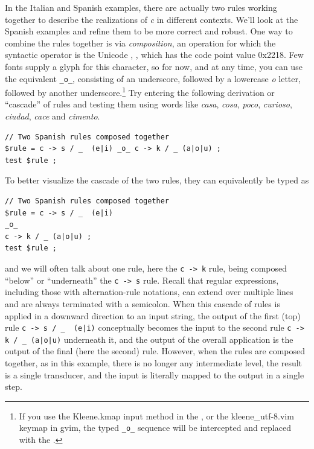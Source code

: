 In the Italian and Spanish examples, there are actually two rules working together to describe the realizations of
\emph{c} in different contexts.  We'll look at the Spanish examples and refine them to be more correct and robust.  One
way to combine the rules together is via \emph{composition}, an
operation for which the syntactic 
operator is the Unicode , \ringop{}, which
has the code point value 0x2218.  Few fonts supply a glyph for this
character, so for now, and at any time, you can use
the  equivalent \verb!_o_!, consisting of an
underscore, followed by a lowercase \emph{o} letter, followed by another underscore.\footnote{If you use the
	Kleene.kmap input method in the , or the kleene\_utf-8.vim
	keymap in gvim, the typed \verb!_o_! sequence will be
intercepted and replaced with the  \ringop{}.}
Try entering the following derivation or ``cascade'' of rules and testing them using words like \emph{casa},
\emph{cosa}, \emph{poco}, \emph{curioso}, \emph{ciudad}, \emph{cace} and \emph{cimento}.


\begin{Verbatim}
// Two Spanish rules composed together
$rule = c -> s / _  (e|i) _o_ c -> k / _ (a|o|u) ;
test $rule ;
\end{Verbatim}

To better visualize the cascade of the two rules, they can equivalently be typed as

\begin{Verbatim}
// Two Spanish rules composed together
$rule = c -> s / _  (e|i) 
_o_ 
c -> k / _ (a|o|u) ;
test $rule ;
\end{Verbatim}

\noindent
and we will often talk about one rule, here the \texttt{c -> k} rule,
being composed ``below'' or
``underneath'' the \texttt{c -> s} rule.  Recall that regular
expressions, including those with alternation-rule notations, can extend
over multiple lines and are always terminated with a semicolon.  When this cascade of rules is applied in a downward direction to an input
string, the output of the first (top) rule \verb!c -> s / _  (e|i)!
conceptually becomes the input to the second rule
\verb!c -> k / _ (a|o|u)!
underneath it, and the output of the overall application is the output of the
final (here the second) rule.  However, when the rules are composed
together, as in this example, there is no longer any intermediate level,
the result is a single transducer, and the input is literally mapped to the output
in a single step.

